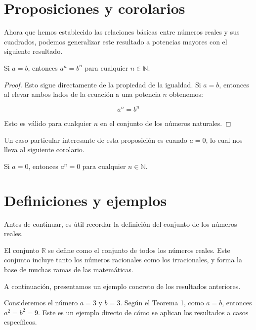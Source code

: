 \section{Proposiciones y corolarios}

Ahora que hemos establecido las relaciones básicas entre números reales y sus cuadrados, podemos generalizar este resultado a potencias mayores con el siguiente resultado.

\begin{proposition}
Si $a = b$, entonces $a^n = b^n$ para cualquier $n \in \mathbb{N}$.
\end{proposition}

\begin{proof}
Esto sigue directamente de la propiedad de la igualdad. Si $a = b$, entonces al elevar ambos lados de la ecuación a una potencia $n$ obtenemos:

\begin{equation*}
a^n = b^n
\end{equation*}

Esto es válido para cualquier $n$ en el conjunto de los números naturales.
\end{proof}

Un caso particular interesante de esta proposición es cuando $a = 0$, lo cual nos lleva al siguiente corolario.

\begin{corollary}
Si $a = 0$, entonces $a^n = 0$ para cualquier $n \in \mathbb{N}$.
\end{corollary}

\section{Definiciones y ejemplos}

Antes de continuar, es útil recordar la definición del conjunto de los números reales.

\begin{definition}
El conjunto $\mathbb{R}$ se define como el conjunto de todos los números reales. Este conjunto incluye tanto los números racionales como los irracionales, y forma la base de muchas ramas de las matemáticas.
\end{definition}

A continuación, presentamos un ejemplo concreto de los resultados anteriores.

\begin{example}
Consideremos el número $a = 3$ y $b = 3$. Según el Teorema 1, como $a = b$, entonces $a^2 = b^2 = 9$. Este es un ejemplo directo de cómo se aplican los resultados a casos específicos.
\end{example}

